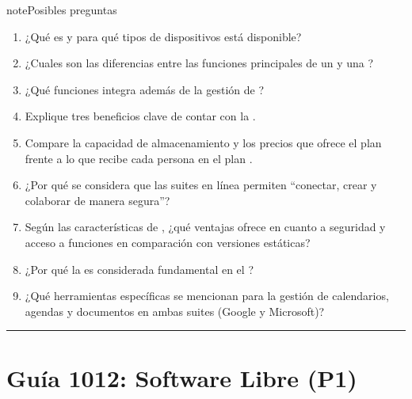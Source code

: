 \documentclass[letterpaper,10pt,spanish]{sphinxmanual}
\begin{document}
\begin{sphinxadmonition}{note}{Posibles preguntas}
\begin{enumerate}
\item {} 
\sphinxAtStartPar
¿Qué es  y para qué tipos de dispositivos está disponible?

\item {} 
\sphinxAtStartPar
¿Cuales son las diferencias entre las funciones principales de un  y una ?

\item {} 
\sphinxAtStartPar
¿Qué funciones integra  además de la gestión de ?

\item {} 
\sphinxAtStartPar
Explique tres beneficios clave de contar con la .

\item {} 
\sphinxAtStartPar
Compare la capacidad de almacenamiento y los precios que ofrece el plan  frente a lo que recibe cada persona en el plan .

\item {} 
\sphinxAtStartPar
¿Por qué se considera que las suites en línea permiten “conectar, crear y colaborar de manera segura”?

\item {} 
\sphinxAtStartPar
Según las características de , ¿qué ventajas ofrece en cuanto a seguridad y acceso a funciones en comparación con versiones estáticas?

\item {} 
\sphinxAtStartPar
¿Por qué la  es considerada fundamental en el ?

\item {} 
\sphinxAtStartPar
¿Qué herramientas específicas se mencionan para la gestión de calendarios, agendas y documentos en ambas suites (Google y Microsoft)?

\end{enumerate}
\end{sphinxadmonition}


\bigskip\hrule\bigskip


\sphinxstepscope


\section{Guía 1012: Software Libre (P1)}
\label{\detokenize{1_guias/10ofimatica/G1012:guia-1012-software-libre-p1}}\label{\detokenize{1_guias/10ofimatica/G1012::doc}}
\end{document}
